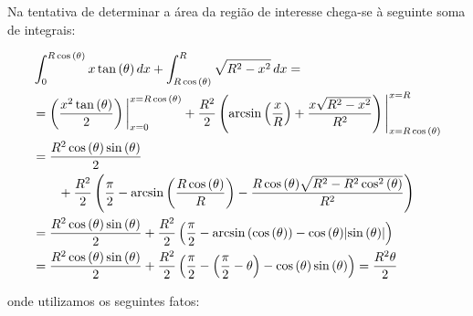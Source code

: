 


Na tentativa de determinar a área da região de interesse chega-se à seguinte
soma de integrais:

\begin{align*}
  &\int_{0}^{R\cos{(\theta)}}x\tan{(\theta)}\,dx
  +
  \int_{R\cos{(\theta)}}^{R}\sqrt{R^{2}-x^{2}}\,dx
  =
  \\
  &=
  \left(
    \frac{x^{2}\tan{(\theta)}}{2}
  \right)
  \bigg{\vert}_{x=0}^{x=R\cos{(\theta)}}
    +
  \frac{R^{2}}{2}
  \left(
    \arcsin{\left(\frac{x}{R}\right)}
    +
    \frac{x\sqrt{R^{2}-x^{2}}}{R^{2}}
  \right)
  \Bigg{\vert}_{x=R\cos{(\theta)}}^{x=R}
  \\
  &=
  \frac{R^{2}\cos{(\theta)\sin{(\theta)}}}{2}
  \\
  &\qquad
  +
  \frac{R^{2}}{2}
  \left(
    \frac{\pi}{2}
    -
    \arcsin{\left(\frac{R\cos{(\theta)}}{R}\right)}
    -
    \frac{R\cos{(\theta)}\sqrt{R^{2}-R^{2}\cos^{2}{(\theta)}}}{R^{2}}
  \right)
  \\
  &=
  \frac{R^{2}\cos{(\theta)\sin{(\theta)}}}{2}
  +
  \frac{R^{2}}{2}
  \left(
    \frac{\pi}{2}
    -
    \arcsin{(\cos{(\theta)})}
    -
    \cos{(\theta)}\lvert\sin{(\theta)}\rvert
  \right)
  \\
  &=
  \frac{R^{2}\cos{(\theta)\sin{(\theta)}}}{2}
  +
  \frac{R^{2}}{2}
  \left(
    \frac{\pi}{2}
    -
    \left(\frac{\pi}{2}-\theta\right)
    -
    \cos{(\theta)}\sin{(\theta)}
  \right)
  =
  \frac{R^{2}\theta}{2}
\end{align*}

onde utilizamos os seguintes fatos:

